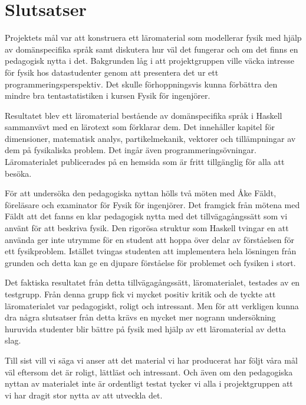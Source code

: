 
\chapter{Slutsatser}

Projektets mål var att konstruera ett läromaterial som modellerar fysik med
hjälp av domänspecifika språk samt diskutera hur väl det fungerar och om det finns en
pedagogisk nytta i det. Bakgrunden låg i att projektgruppen ville väcka intresse
för fysik hos datastudenter genom att presentera det ur ett 
programmeringsperspektiv. Det skulle förhoppningsvis kunna förbättra den mindre
bra tentastatistiken i kursen Fysik för ingenjörer.

Resultatet blev ett läromaterial bestående av domänspecifika språk i Haskell
sammanvävt med en lärotext som förklarar dem. Det innehåller kapitel för
dimensioner, matematisk analys, partikelmekanik, vektorer och tillämpningar av
dem på fysikaliska problem. Det ingår även programmeringsövningar.
Läromaterialet publicerades på en hemsida som är fritt tillgänglig för alla att
besöka.

För att undersöka den pedagogiska nyttan hölls två möten med Åke Fäldt, föreläsare och examinator för Fysik
för ingenjörer. Det framgick från mötena med Fäldt att det fanns en klar
pedagogisk nytta med det tillvägagångssätt som vi använt för att beskriva fysik.
Den rigorösa struktur som Haskell tvingar en att använda ger inte utrymme för en
student att hoppa över delar av förståelsen för ett fysikproblem. Istället
tvingas studenten att implementera hela lösningen från grunden och detta kan
ge en djupare förståelse för problemet och fysiken i stort. 

Det faktiska resultatet från detta tillvägagångssätt, läromaterialet,
testades av en testgrupp. Från denna grupp fick vi mycket positiv kritik och de
tyckte att läromaterialet var pedagogiskt, roligt och intressant. Men för att
verkligen kunna dra några slutsatser från detta krävs en mycket mer nogrann
undersökning huruvida studenter blir bättre på fysik med hjälp av ett
läromaterial av detta slag.

Till sist vill vi säga vi anser att det material vi har producerat har följt våra mål väl eftersom det är roligt, lättläst och intressant. Och även om den pedagogiska nyttan av materialet inte är ordentligt testat tycker vi alla i projektgruppen att vi har dragit stor nytta av att utveckla det.
